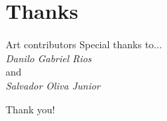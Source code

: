 \documentclass{beamer}
\begin{document}
%

\section{Thanks}
    \begin{frame}{Art contributors}
        Special thanks to...\\[3em]

        \centering
        \emph{Danilo Gabriel Rios}\\[1em]
        and\\[1em]
        \emph{Salvador Oliva Junior}
    \end{frame}

    \begin{frame}{}
        \centering
        {\huge
        Thank you!}
    \end{frame}
\end{document}
